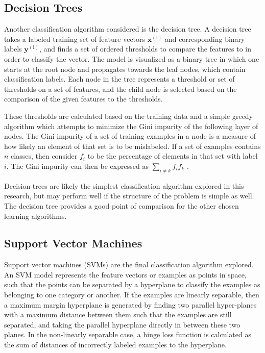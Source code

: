 \subsection{Decision Trees}

Another classification algorithm considered is the decision tree. 
A decision tree takes a labeled training set of feature vectors $\mathbf{x^{(i)}}$ and corresponding binary labels $\mathbf{y^{(i)}}$, and finds a set of ordered thresholds to compare the features to in order to classify the vector.
The model is visualized as a binary tree in which one starts at the root node and propagates towards the leaf nodes, which contain classification labels.
Each node in the tree represents a threshold or set of thresholds on a set of features, and the child node is selected based on the comparison of the given features to the thresholds.

These thresholds are calculated based on the training data and a simple greedy algorithm which attempts to minimize the Gini impurity of the following layer of nodes.
The Gini impurity of a set of training examples in a node is a measure of how likely an element of that set is to be mislabeled.
If a set of examples contains $n$ classes, then consider $f_i$ to be the percentage of elements in that set with label $i$.
The Gini impurity can then be expressed as $\sum_{i \not = k} f_if_k$ .

Decision trees are likely the simplest classification algorithm explored in this research, but may perform well if the structure of the problem is simple as well.
The decision tree provides a good point of comparison for the other chosen learning algorithms.



\subsection{Support Vector Machines}

Support vector machines (SVMs) are the final classification algorithm explored.
An SVM model represents the feature vectors or examples as points in space, such that the points can be separated by a hyperplane to classify the examples as belonging to one category or another.
If the examples are linearly separable, then a maximum margin hyperplane is generated by finding two parallel hyper-planes with a maximum distance between them such that the examples are still separated, and taking the parallel hyperplane directly in between these two planes.
In the non-linearly separable case, a hinge loss function is calculated as the sum of distances of incorrectly labeled examples to the hyperplane.

